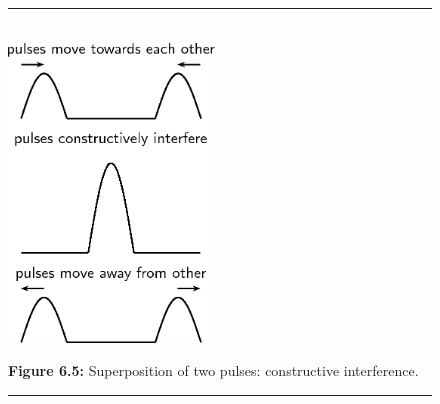 	\begin{figure}[H] %
    \begin{center}
    \rule[.1in]{\figurerulewidth}{.005in} \\
        \label{m38802*uid53!!!underscore!!!media}\label{m38802*uid53!!!underscore!!!printimage}\includegraphics[height=300px]{col11305.imgs/m38802_PG10C4_018.png} %
        
      \vspace{2pt}
    \vspace{\rubberspace}\par \begin{cnxcaption}
	  \small \textbf{Figure 6.5: }Superposition of two pulses: constructive interference.
	\end{cnxcaption}
      
    \vspace{.1in}
    \rule[.1in]{\figurerulewidth}{.005in} \\
        
    \end{center}

 \end{figure}   

    \addtocounter{footnote}{-0}
    
